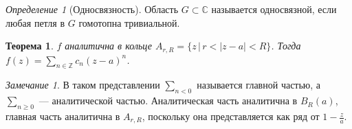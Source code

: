 \documentclass[12pt]{article}
\newcommand{\Z}{\mathbb{Z}}
\renewcommand{\C}{\mathbb{C}}
\newcounter{cnt}
\theoremstyle{thmnote}
\newtheorem{theorem}[cnt]{Теорема}
\theoremstyle{remark}
\newtheorem*{remark}{Замечание}
\theoremstyle{defnote}
\newtheorem{definition}[cnt]{Определение}
\begin{document}
\begin{definition}[Односвязность]
    Область $G \subset \C$ называется односвязной, если любая петля в $G$ гомотопна тривиальной.
\end{definition}

\begin{theorem}
    $f$ аналитична в кольце $A_{r, R} = \{z \,|\, r < |z - a| < R\}$. Тогда $f(z) = \sum_{n \in \Z} c_n (z - a)^n$.
\end{theorem}

\begin{remark}
    В таком представлении $\sum_{n < 0}$ называется главной частью, а $\sum_{n \geq 0}$ --- аналитической частью. Аналитическая часть аналитична в $B_R(a)$, главная часть аналитична в $A_{r, R}$, поскольку она представляется как ряд от $1 - \frac{z}{a}$.
\end{remark}
\end{document}
